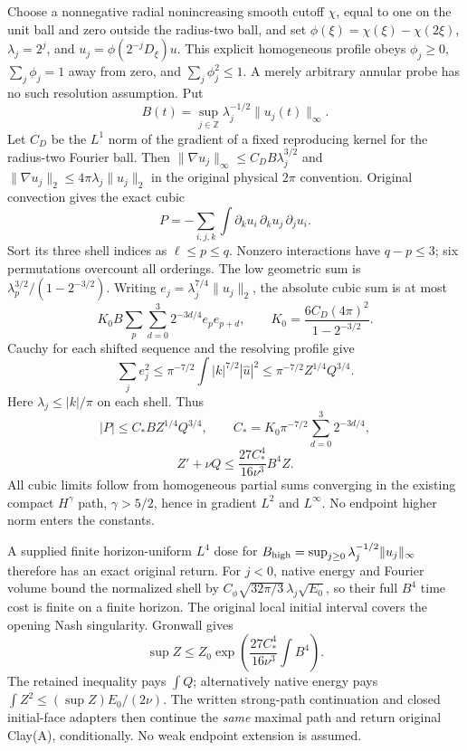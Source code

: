 \documentclass[11pt]{article}
\begin{document}
Choose a nonnegative radial nonincreasing smooth cutoff $\chi$, equal to
one on the unit ball and zero outside the radius-two ball, and set
$\phi(\xi)=\chi(\xi)-\chi(2\xi)$, $\lambda_j=2^j$, and
$u_j=\phi(2^{-j}D_\xi)u$. This explicit homogeneous profile obeys
$\phi_j\ge0$, $\sum_j\phi_j=1$ away from zero, and
$\sum_j\phi_j^2\le1$. A merely arbitrary annular probe has no such
resolution assumption. Put
\[
 B(t)=\sup_{j\in\mathbb Z}\lambda_j^{-1/2}\|u_j(t)\|_\infty.
\]
Let $C_D$ be the $L^1$ norm of the gradient of a fixed reproducing kernel
for the radius-two Fourier ball. Then
$\|\nabla u_j\|_\infty\le C_D B\lambda_j^{3/2}$ and
$\|\nabla u_j\|_2\le4\pi\lambda_j\|u_j\|_2$ in the original
physical $2\pi$ convention. Original convection gives the exact cubic
\[
 P=-\sum_{i,j,k}\int\partial_k u_i\,\partial_k u_j\,\partial_j u_i.
\]
Sort its three shell indices as $\ell\le p\le q$. Nonzero interactions
have $q-p\le3$; six permutations overcount all orderings. The low
geometric sum is $\lambda_p^{3/2}/(1-2^{-3/2})$. Writing
$e_j=\lambda_j^{7/4}\|u_j\|_2$, the absolute cubic sum is at most
\[
 K_0B\sum_p\sum_{d=0}^3 2^{-3d/4}e_pe_{p+d},
 \qquad K_0=\frac{6C_D(4\pi)^2}{1-2^{-3/2}}.
\]
Cauchy for each shifted sequence and the resolving profile give
\[
 \sum_j e_j^2\le\pi^{-7/2}\int |k|^{7/2}|\widehat u|^2
 \le\pi^{-7/2}Z^{1/4}Q^{3/4}.
\]
Here $\lambda_j\le |k|/\pi$ on each shell. Thus
\[
 |P|\le C_* BZ^{1/4}Q^{3/4},\qquad
 C_*=K_0\pi^{-7/2}\sum_{d=0}^3 2^{-3d/4},
\]
\[
 Z'+\nu Q\le\frac{27C_*^4}{16\nu^3}B^4 Z.
\]
All cubic limits follow from homogeneous partial sums converging in the
existing compact $H^\gamma$ path, $\gamma>5/2$, hence in gradient
$L^2$ and $L^\infty$. No endpoint higher norm enters the constants.

A supplied finite horizon-uniform $L^4$ dose for
$B_{\rm high}=\sup_{j\ge0}\lambda_j^{-1/2}\|u_j\|_\infty$ therefore
has an exact original return. For $j<0$, native energy and Fourier volume
bound the normalized shell by
$C_\phi\sqrt{32\pi/3}\,\lambda_j\sqrt{E_0}$, so their full $B^4$
time cost is finite on a finite horizon. The original local initial
interval covers the opening Nash singularity. Gronwall gives
\[
 \sup Z\le Z_0\exp\left(\frac{27C_*^4}{16\nu^3}\int B^4\right).
\]
The retained inequality pays $\int Q$; alternatively native energy pays
$\int Z^2\le(\sup Z)E_0/(2\nu)$. The written strong-path continuation
and closed initial-face adapters then continue the \emph{same} maximal
path and return original Clay(A), conditionally. No weak endpoint
extension is assumed.
\end{document}
